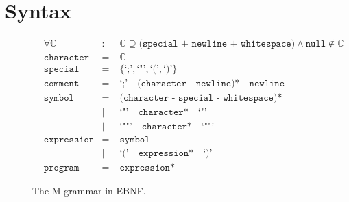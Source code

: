 \documentclass{article}
\begin{document}
    \section{Syntax}\label{sec:syntax}

    \begin{figure}[h]
        \centering
        \begin{align*}
            &\forall\mathbb{C}  &:&\;\mathbb{C}\supseteq\texttt{(special + newline + whitespace)}\land\texttt{null}\notin\mathbb{C}\\
            &\texttt{character} &=&\;\mathbb{C}\\
            &\texttt{special}   &=&\;\{\texttt{`;'},\texttt{`"'},\texttt{`('},\texttt{`)'}\}\\
            &\texttt{comment}   &=&\;\texttt{`;'}\quad\texttt{(character - newline)*}\quad\texttt{newline}\\
            &\texttt{symbol}    &=&\;\texttt{(character - special - whitespace)*}\\
            &                   &|&\;\texttt{`"'}\quad\texttt{character*}\quad\texttt{`"'}\\
            &                   &|&\;\texttt{`""'}\quad\texttt{character*}\quad\texttt{`""'}\\
            &\texttt{expression}&=&\;\texttt{symbol}\\
            &                   &|&\;\texttt{`('}\quad\texttt{expression*}\quad\texttt{`)'}\\
            &\texttt{program}   &=&\;\texttt{expression*}
        \end{align*}
        \caption{The M grammar in EBNF.}
    \end{figure}
\end{document}
